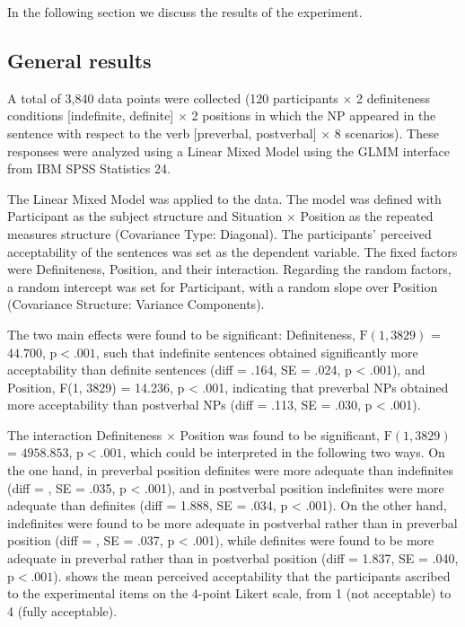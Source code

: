 \documentclass[output=paper]{langsci/langscibook}
\begin{document}
In the following section we discuss the results of the experiment.

\subsection{General results}\label{2sec:33}

A total of 3,840 data points were collected (120 participants $\times$ 2 definiteness conditions [indefinite, definite] $\times$ 2 positions in which the NP appeared in the sentence with respect to the verb [preverbal, postverbal] $\times$ 8 scenarios). These responses were analyzed using a Linear Mixed Model using the GLMM interface from IBM SPSS Statistics 24.

The Linear Mixed Model was applied to the data. The model was defined with Participant as the subject structure and Situation $\times$ Position as the repeated measures structure (Covariance Type: Diagonal). The participants' perceived acceptability of the sentences was set as the dependent variable. The fixed factors were Definiteness, Position, and their interaction. Regarding the random factors, a random intercept was set for Participant, with a random slope over Position (Covariance Structure: Variance Components).

The two main effects were found to be significant: Definiteness, $\text{F}(1, 3829)$ = $44.700$, $\text{p} < .001$, such that indefinite sentences obtained significantly more acceptability than definite sentences (diff = .164, SE = .024, p < .001), and Position, F(1, 3829) = 14.236, p < .001, indicating that preverbal NPs obtained more acceptability than postverbal NPs (diff = .113, SE = .030, p < .001).

{
The interaction Definiteness $\times$ Position was found to be significant, $\text{F}(1, 3829)$ = $4958.853$, $\text{p} < .001$, which could be interpreted in the following two ways. On the one hand, in preverbal position definites were more adequate than indefinites (diff = , SE = .035, p < .001), and in postverbal position indefinites were more adequate than definites (diff = 1.888, SE = .034, p < .001). On the other hand, indefinites were found to be more adequate in postverbal rather than in preverbal position (diff = , SE = .037, p < .001), while definites were found to be more adequate in preverbal rather than in postverbal position (diff = 1.837, SE = .040, $\text{p} < .001$).  shows the mean perceived acceptability that the participants ascribed to the experimental items on the 4-point Likert scale, from 1 (not acceptable) to 4 (fully acceptable).
}
\end{document}
